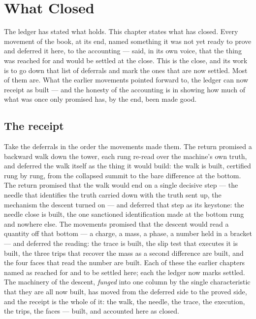\chapter{What Closed}
\label{chap:what-closed}

The ledger has stated what holds. This chapter states what has closed. Every movement of the book, at its
end, named something it was not yet ready to prove and deferred it here, to the accounting --- said, in its
own voice, that the thing was reached for and would be settled at the close. This is the close, and its work
is to go down that list of deferrals and mark the ones that are now settled. Most of them are. What the
earlier movements pointed forward to, the ledger can now receipt as built --- and the honesty of the
accounting is in showing how much of what was once only promised has, by the end, been made good.

\section{The receipt}
\label{se:the-receipt}

Take the deferrals in the order the movements made them. The return promised a backward walk down the tower,
each rung re-read over the machine's own truth, and deferred the walk itself as the thing it would build:
the walk is built, certified rung by rung, from the collapsed summit to the bare difference at the bottom.
The return promised that the walk would end on a single decisive step --- the needle that identifies the
truth carried down with the truth sent up, the mechanism the descent turned on --- and deferred that step as
its keystone: the needle close is built, the one sanctioned identification made at the bottom rung and
nowhere else. The movements promised that the descent would read a quantity off that bottom --- a charge, a
mass, a phase, a number held in a bracket --- and deferred the reading: the trace is built, the slip test
that executes it is built, the three trips that recover the mass as a second difference are built, and the
four faces that read the number are built. Each of these the earlier chapters named as reached for and to be
settled here; each the ledger now marks settled. The machinery of the descent, \emph{funged} into one column by the single
characteristic that they are all now built, has
moved from the deferred side to the proved side, and the receipt is the whole of it: the walk, the needle,
the trace, the execution, the trips, the faces --- built, and accounted here as closed.

